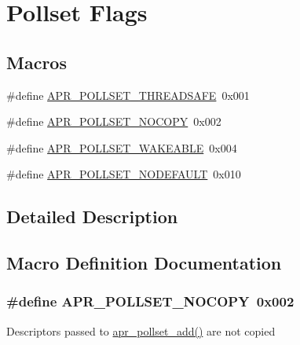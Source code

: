 \hypertarget{group__pollflags}{}\section{Pollset Flags}
\label{group__pollflags}
\subsection*{Macros}
\begin{DoxyCompactItemize}
\item 
\#define \hyperlink{group__pollflags_gabdfaccfd394c847f692351dee2e5ef7f}{A\+P\+R\+\_\+\+P\+O\+L\+L\+S\+E\+T\+\_\+\+T\+H\+R\+E\+A\+D\+S\+A\+FE}~0x001
\item 
\#define \hyperlink{group__pollflags_ga0febaf4378d2705bf1256b22fe8dfd24}{A\+P\+R\+\_\+\+P\+O\+L\+L\+S\+E\+T\+\_\+\+N\+O\+C\+O\+PY}~0x002
\item 
\#define \hyperlink{group__pollflags_ga552d7f28d442602e6c9bb6931f183493}{A\+P\+R\+\_\+\+P\+O\+L\+L\+S\+E\+T\+\_\+\+W\+A\+K\+E\+A\+B\+LE}~0x004
\item 
\#define \hyperlink{group__pollflags_gaa46a9cbb23b2e8e71dd3ba88e69fdf13}{A\+P\+R\+\_\+\+P\+O\+L\+L\+S\+E\+T\+\_\+\+N\+O\+D\+E\+F\+A\+U\+LT}~0x010
\end{DoxyCompactItemize}


\subsection{Detailed Description}


\subsection{Macro Definition Documentation}
\subsubsection[{\texorpdfstring{A\+P\+R\+\_\+\+P\+O\+L\+L\+S\+E\+T\+\_\+\+N\+O\+C\+O\+PY}{APR_POLLSET_NOCOPY}}]{\setlength{\rightskip}{0pt plus 5cm}\#define A\+P\+R\+\_\+\+P\+O\+L\+L\+S\+E\+T\+\_\+\+N\+O\+C\+O\+PY~0x002}\hypertarget{group__pollflags_ga0febaf4378d2705bf1256b22fe8dfd24}{}\label{group__pollflags_ga0febaf4378d2705bf1256b22fe8dfd24}
Descriptors passed to \hyperlink{group__apr__poll_ga4ec50bf9a11c6b60927c51b81412f5b9}{apr\+\_\+pollset\+\_\+add()} are not copied 
